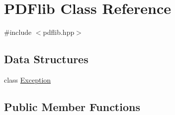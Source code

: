 \hypertarget{classPDFlib}{\section{P\+D\+Flib Class Reference}
\label{classPDFlib}
}


{\ttfamily \#include $<$pdflib.\+hpp$>$}

\subsection*{Data Structures}
\begin{DoxyCompactItemize}
\item 
class \hyperlink{classPDFlib_1_1Exception}{Exception}
\end{DoxyCompactItemize}
\subsection*{Public Member Functions}
